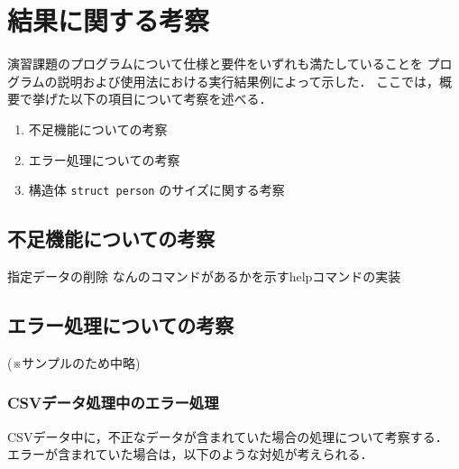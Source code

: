 \documentclass[a4j,11pt]{jarticle}
\begin{document}
\section{結果に関する考察}


演習課題のプログラムについて仕様と要件をいずれも満たしていることを
プログラムの説明および使用法における実行結果例によって示した．
ここでは，概要で挙げた以下の項目について考察を述べる．

\begin{enumerate}
\setlength{\parskip}{2pt} \setlength{\itemsep}{2pt}
    \item 不足機能についての考察
    \item エラー処理についての考察
    \item 構造体 \verb|struct person| のサイズに関する考察
\end{enumerate}

\subsection{不足機能についての考察}

指定データの削除
なんのコマンドがあるかを示すhelpコマンドの実装

\subsection{エラー処理についての考察}

(※サンプルのため中略)

\subsubsection{CSVデータ処理中のエラー処理}

CSVデータ中に，不正なデータが含まれていた場合の処理について考察する．
エラーが含まれていた場合は，以下のような対処が考えられる．
\end{document}
